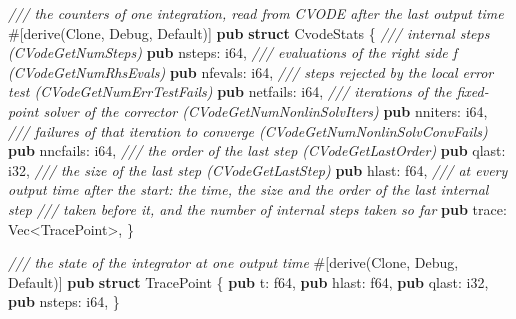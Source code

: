 \documentclass[
  10pt,
]{article}
\newenvironment{Shaded}{}{}
\newcommand{\AttributeTok}[1]{\textcolor[rgb]{0.49,0.56,0.16}{#1}}
\newcommand{\BuiltInTok}[1]{\textcolor[rgb]{0.00,0.50,0.00}{#1}}
\newcommand{\CommentTok}[1]{\textcolor[rgb]{0.38,0.63,0.69}{\textit{#1}}}
\newcommand{\DataTypeTok}[1]{\textcolor[rgb]{0.56,0.13,0.00}{#1}}
\newcommand{\KeywordTok}[1]{\textcolor[rgb]{0.00,0.44,0.13}{\textbf{#1}}}
\newcommand{\NormalTok}[1]{#1}
\newcommand{\OperatorTok}[1]{\textcolor[rgb]{0.40,0.40,0.40}{#1}}
\begin{document}
\begin{Shaded}
\begin{Highlighting}[]
\CommentTok{/// the counters of one integration, read from CVODE after the last output time}
\AttributeTok{\#[}\NormalTok{derive}\AttributeTok{(}\BuiltInTok{Clone}\OperatorTok{,} \BuiltInTok{Debug}\OperatorTok{,} \BuiltInTok{Default}\AttributeTok{)]}
\KeywordTok{pub} \KeywordTok{struct}\NormalTok{ CvodeStats }\OperatorTok{\{}
    \CommentTok{/// internal steps (CVodeGetNumSteps)}
    \KeywordTok{pub}\NormalTok{ nsteps}\OperatorTok{:} \DataTypeTok{i64}\OperatorTok{,}
    \CommentTok{/// evaluations of the right side f (CVodeGetNumRhsEvals)}
    \KeywordTok{pub}\NormalTok{ nfevals}\OperatorTok{:} \DataTypeTok{i64}\OperatorTok{,}
    \CommentTok{/// steps rejected by the local error test (CVodeGetNumErrTestFails)}
    \KeywordTok{pub}\NormalTok{ netfails}\OperatorTok{:} \DataTypeTok{i64}\OperatorTok{,}
    \CommentTok{/// iterations of the fixed{-}point solver of the corrector (CVodeGetNumNonlinSolvIters)}
    \KeywordTok{pub}\NormalTok{ nniters}\OperatorTok{:} \DataTypeTok{i64}\OperatorTok{,}
    \CommentTok{/// failures of that iteration to converge (CVodeGetNumNonlinSolvConvFails)}
    \KeywordTok{pub}\NormalTok{ nncfails}\OperatorTok{:} \DataTypeTok{i64}\OperatorTok{,}
    \CommentTok{/// the order of the last step (CVodeGetLastOrder)}
    \KeywordTok{pub}\NormalTok{ qlast}\OperatorTok{:} \DataTypeTok{i32}\OperatorTok{,}
    \CommentTok{/// the size of the last step (CVodeGetLastStep)}
    \KeywordTok{pub}\NormalTok{ hlast}\OperatorTok{:} \DataTypeTok{f64}\OperatorTok{,}
    \CommentTok{/// at every output time after the start: the time, the size and the order of the last internal step}
    \CommentTok{/// taken before it, and the number of internal steps taken so far}
    \KeywordTok{pub}\NormalTok{ trace}\OperatorTok{:} \DataTypeTok{Vec}\OperatorTok{\textless{}}\NormalTok{TracePoint}\OperatorTok{\textgreater{},}
\OperatorTok{\}}

\CommentTok{/// the state of the integrator at one output time}
\AttributeTok{\#[}\NormalTok{derive}\AttributeTok{(}\BuiltInTok{Clone}\OperatorTok{,} \BuiltInTok{Debug}\OperatorTok{,} \BuiltInTok{Default}\AttributeTok{)]}
\KeywordTok{pub} \KeywordTok{struct}\NormalTok{ TracePoint }\OperatorTok{\{}
    \KeywordTok{pub}\NormalTok{ t}\OperatorTok{:} \DataTypeTok{f64}\OperatorTok{,}
    \KeywordTok{pub}\NormalTok{ hlast}\OperatorTok{:} \DataTypeTok{f64}\OperatorTok{,}
    \KeywordTok{pub}\NormalTok{ qlast}\OperatorTok{:} \DataTypeTok{i32}\OperatorTok{,}
    \KeywordTok{pub}\NormalTok{ nsteps}\OperatorTok{:} \DataTypeTok{i64}\OperatorTok{,}
\OperatorTok{\}}


\end{Highlighting}
\end{Shaded}
\end{document}
